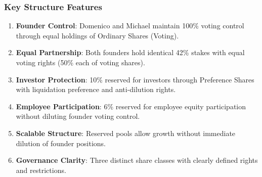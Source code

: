 \subsubsection{Key Structure Features}

\begin{enumerate}[label=(\alph*)]
\item \textbf{Founder Control}: Domenico and Michael maintain 100\% voting control through equal holdings of Ordinary Shares (Voting).

\item \textbf{Equal Partnership}: Both founders hold identical 42\% stakes with equal voting rights (50\% each of voting shares).

\item \textbf{Investor Protection}: 10\% reserved for investors through Preference Shares with liquidation preference and anti-dilution rights.

\item \textbf{Employee Participation}: 6\% reserved for employee equity participation without diluting founder voting control.

\item \textbf{Scalable Structure}: Reserved pools allow growth without immediate dilution of founder positions.

\item \textbf{Governance Clarity}: Three distinct share classes with clearly defined rights and restrictions.
\end{enumerate} 